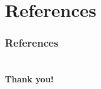 \documentclass[11pt]{beamer}
\begin{document}
\section*{References}
\begin{frame}[allowframebreaks]
  \frametitle{References}
  \begin{small}
    \def\newblock{\hskip .11em plus .33em minus .07em} %
    
    
  \end{small}
\end{frame}


\section*{}
\begin{frame}

  \addtocounter{framenumber}{-1}

  \vspace{1cm}
  \begin{center}
    {\color{SUblue} \textbf{\Huge Thank you!}}
  \end{center}

\end{frame}
\end{document}
